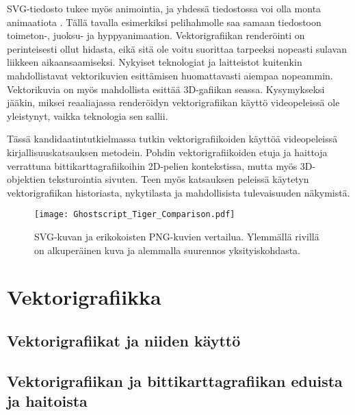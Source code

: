 \documentclass[utf8,bachelor]{gradu3}
\begin{document}
SVG-tiedosto tukee myös animointia, ja yhdessä tiedostossa voi olla monta animaatiota \parencite{RefWorks:doc:5bd74719e4b0e42e08f6333b}. Tällä tavalla esimerkiksi pelihahmolle saa samaan tiedostoon toimeton-, juoksu- ja hyppyanimaation. Vektorigrafiikan renderöinti on perinteisesti ollut hidasta, eikä sitä ole voitu suorittaa tarpeeksi nopeasti sulavan liikkeen aikaansaamiseksi. Nykyiset teknologiat ja laitteistot kuitenkin mahdollistavat vektorikuvien esittämisen huomattavasti aiempaa nopeammin. Vektorikuvia on myös mahdollista esittää 3D-gafiikan seassa. \parencite{RefWorks:doc:5bc4a5cce4b080e02f7eff1b} Kysymykseksi jääkin, miksei reaaliajassa renderöidyn vektorigrafiikan käyttö videopeleissä ole yleistynyt, vaikka teknologia sen sallii.

Tässä kandidaatintutkielmassa tutkin vektorigrafiikoiden käyttöä videopeleissä kirjallisuuskatsauksen metodein. Pohdin vektorigrafiikoiden etuja ja haittoja verrattuna bittikarttagrafiikoihin 2D-pelien kontekstissa, mutta myös 3D-objektien teksturointia sivuten. Teen myös katsauksen peleissä käytetyn vektorigrafiikan historiasta, nykytilasta ja mahdollisista tulevaisuuden näkymistä.

\begin{figure}[!b]
	\centering
	\texttt{[image: Ghostscript\_Tiger\_Comparison.pdf]}
    \caption{SVG-kuvan ja erikokoisten PNG-kuvien vertailua. Ylemmällä rivillä on alkuperäinen kuva ja alemmalla suurennos yksityiskohdasta.}\label{vertailu}
\end{figure}

\chapter{Vektorigrafiikka}

\section{Vektorigrafiikat ja niiden käyttö}


\section{Vektorigrafiikan ja bittikarttagrafiikan eduista ja haitoista}
\end{document}
